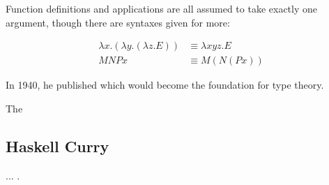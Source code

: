 Function definitions and applications are all assumed to take exactly one argument,
though there are syntaxes given for more:

\begin{align}
	\lambda x . (\lambda y . (\lambda z . E)) & \equiv \lambda x y z . E
	\tag{function definition}
	\\
	M N P x                                   & \equiv M (N (P x))
	\tag{function application}
\end{align}

In 1940, he published 
which would become the foundation for type theory.

The \lambdacalc{}

\subsection{Haskell Curry}

...
.
